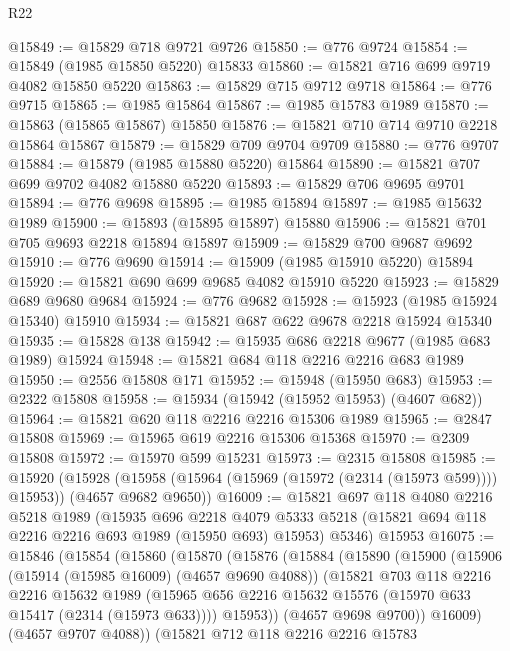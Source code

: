 \begin{lexlean}{R22}
\begin{coremodule}
@15849 := @15829 @718 @9721 @9726
@15850 := @776 @9724
@15854 := @15849 (@1985 @15850 @5220) @15833
@15860 := @15821 @716 @699 @9719 @4082 @15850 @5220
@15863 := @15829 @715 @9712 @9718
@15864 := @776 @9715
@15865 := @1985 @15864
@15867 := @1985 @15783 @1989
@15870 := @15863 (@15865 @15867) @15850
@15876 := @15821 @710 @714 @9710 @2218 @15864 @15867
@15879 := @15829 @709 @9704 @9709
@15880 := @776 @9707
@15884 := @15879 (@1985 @15880 @5220) @15864
@15890 := @15821 @707 @699 @9702 @4082 @15880 @5220
@15893 := @15829 @706 @9695 @9701
@15894 := @776 @9698
@15895 := @1985 @15894
@15897 := @1985 @15632 @1989
@15900 := @15893 (@15895 @15897) @15880
@15906 := @15821 @701 @705 @9693 @2218 @15894 @15897
@15909 := @15829 @700 @9687 @9692
@15910 := @776 @9690
@15914 := @15909 (@1985 @15910 @5220) @15894
@15920 := @15821 @690 @699 @9685 @4082 @15910 @5220
@15923 := @15829 @689 @9680 @9684
@15924 := @776 @9682
@15928 := @15923 (@1985 @15924 @15340) @15910
@15934 := @15821 @687 @622 @9678 @2218 @15924 @15340
@15935 := @15828 @138
@15942 := @15935 @686 @2218 @9677 (@1985 @683 @1989) @15924
@15948 := @15821 @684 @118 @2216 @2216 @683 @1989
@15950 := @2556 @15808 @171
@15952 := @15948 (@15950 @683)
@15953 := @2322 @15808
@15958 := @15934 (@15942 (@15952 @15953) (@4607 @682))
@15964 := @15821 @620 @118 @2216 @2216 @15306 @1989
@15965 := @2847 @15808
@15969 := @15965 @619 @2216 @15306 @15368
@15970 := @2309 @15808
@15972 := @15970 @599 @15231
@15973 := @2315 @15808
@15985 := @15920
    (@15928 (@15958 (@15964 (@15969 (@15972 (@2314 (@15973 @599)))) @15953)) (@4657 @9682 @9650))
@16009 := @15821
    @697
    @118
    @4080
    @2216
    @5218
    @1989
    (@15935
      @696
      @2218
      @4079
      @5333
      @5218
      (@15821 @694 @118 @2216 @2216 @693 @1989 (@15950 @693) @15953)
      @5346)
    @15953
@16075 := @15846
    (@15854
      (@15860
        (@15870
          (@15876
            (@15884
              (@15890
                (@15900
                  (@15906
                    (@15914 (@15985 @16009) (@4657 @9690 @4088))
                    (@15821
                      @703
                      @118
                      @2216
                      @2216
                      @15632
                      @1989
                      (@15965 @656 @2216 @15632 @15576 (@15970 @633 @15417 (@2314 (@15973 @633))))
                      @15953))
                  (@4657 @9698 @9700))
                @16009)
              (@4657 @9707 @4088))
            (@15821
              @712
              @118
              @2216
              @2216
              @15783

\end{coremodule}
\end{lexlean}
